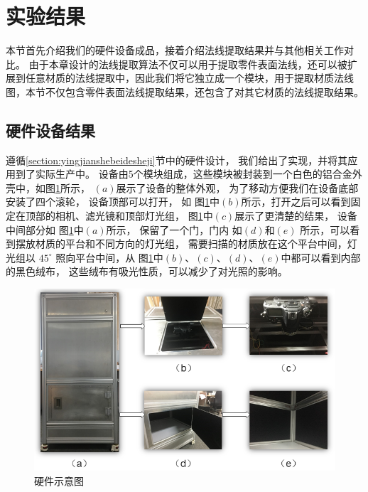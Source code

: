 \section{实验结果}

本节首先介绍我们的硬件设备成品，接着介绍法线提取结果并与其他相关工作对比。
由于本章设计的法线提取算法不仅可以用于提取零件表面法线，还可以被扩展到任意材质的法线提取中，因此我们将它独立成一个模块，用于提取材质法线图，本节不仅包含零件表面法线提取结果，还包含了对其它材质的法线提取结果。

\subsection{硬件设备结果}

遵循\ref{section:yingjianshebeidesheji}节中的硬件设计，
我们给出了实现，并将其应用到了实际生产中。
设备由5个模块组成，这些模块被封装到一个白色的铝合金外壳中，如图\ref{fig:yingjianjieguo}所示，
$(a)$展示了设备的整体外观，
为了移动方便我们在设备底部安装了四个滚轮，
设备顶部可以打开，
如
图\ref{fig:yingjianjieguo}中$(b)$所示，打开之后可以看到固定在顶部的相机、滤光镜和顶部灯光组，
图\ref{fig:yingjianjieguo}中$(c)$展示了更清楚的结果，
设备中间部分如
图\ref{fig:yingjianjieguo}中$(a)$所示，
保留了一个门，门内
如$(d)$和$(e)$
所示，可以看到摆放材质的平台和不同方向的灯光组，
需要扫描的材质放在这个平台中间，灯光组以
${45}^{\circ}$
照向平台中间，从
图\ref{fig:yingjianjieguo}中$(b)$、$(c)$、$(d)$、$(e)$中都可以看到内部的黑色绒布，
这些绒布有吸光性质，可以减少了对光照的影响。

\begin{figure}[htbp]
\centering
\centerline{\includegraphics[width=1.0\linewidth]{figures/yingjianjieguo.png}}
\caption{硬件示意图}
\label{fig:yingjianjieguo}
\end{figure}

